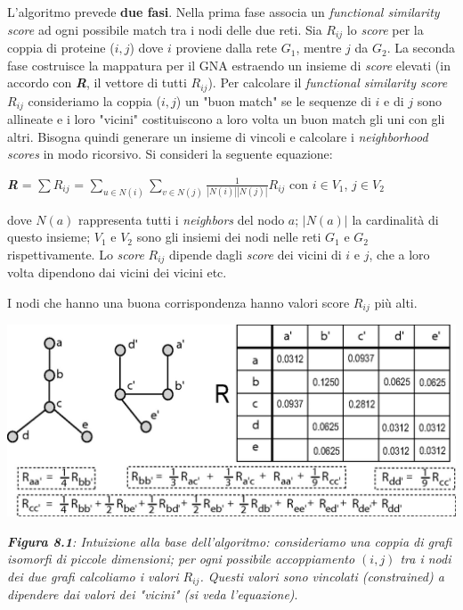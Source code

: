 \documentclass[11pt]{article}
\begin{document}
L'algoritmo prevede \textbf{due fasi}. Nella prima fase associa un \textit{functional similarity score} ad ogni possibile match tra i nodi delle due reti. Sia $R_{ij}$ lo \textit{score} per la coppia di proteine ($i,j$) dove $i$ proviene dalla rete $G_1$, mentre $j$ da $G_2$. La seconda fase costruisce la mappatura per il GNA estraendo un insieme di \textit{score} elevati (in accordo con \textit{\textbf{R}}, il vettore di tutti $R_{ij}$).
Per calcolare il \textit{functional similarity score} $R_{ij}$ consideriamo la coppia ($i,j$) un "buon match" se le sequenze di $i$ e di $j$ sono allineate e i loro "vicini" costituiscono a loro volta un buon match gli uni con gli altri. Bisogna quindi generare un insieme di vincoli e calcolare i \textit{neighborhood scores} in modo ricorsivo. Si consideri la seguente equazione:

\begin{center}
\textit{\textbf{R}} = $\sum R_{ij}$ = $\displaystyle{\sum_{u \in N(i)}} \displaystyle{\sum_{v \in N(j)}\frac{1}{|N(i)||N(j)|} R_{ij}}$ con $i \in V_1$, $j \in V_2$
\end{center}

dove $N(a)$ rappresenta tutti i \textit{neighbors} del nodo $a$; $|N(a)|$ la cardinalità di questo insieme; $V_1$ e $V_2$ sono gli insiemi dei nodi nelle reti $G_1$ e $G_2$ rispettivamente. Lo \textit{score} $R_{ij}$ dipende dagli \textit{score} dei vicini di $i$ e $j$, che a loro volta dipendono dai vicini dei vicini etc.

I nodi che hanno una buona corrispondenza hanno valori score $R_{ij}$ più alti.

\begin{center}
\includegraphics[scale=0.3]{isorank}

\begin{small}\textit{\textbf{Figura 8.1}: Intuizione alla base dell'algoritmo: consideriamo una coppia di grafi isomorfi di piccole dimensioni; per ogni possibile accoppiamento $(i,j)$ tra i nodi dei due grafi calcoliamo i valori $R_{ij}$. Questi valori sono vincolati (\textit{constrained}) a dipendere dai valori dei "vicini" (si veda l'equazione)}.\end{small}
\end{center}
\end{document}
